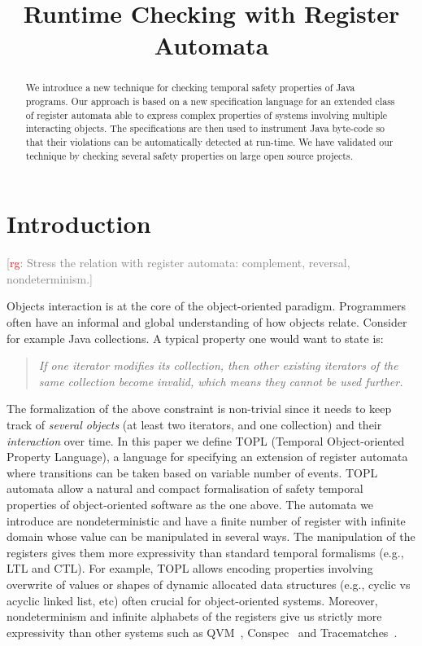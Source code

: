 \documentclass{sigplanconf}[10pt] %
\title{Runtime Checking with Register Automata}
\newcommand{\noterg}[2]{\textcolor{gray}{[\textcolor{red}{#1}: #2]}}
\newcommand{\rg}[1]{\noterg{rg}{#1}}
\begin{document}
\maketitle

\begin{abstract} %
We introduce a new technique for checking temporal safety properties of Java programs.
Our approach is based on a new specification language for an extended class of register automata able to express complex properties of systems involving multiple interacting objects.
The specifications are then used to instrument Java byte-code so that their violations can be automatically detected at run-time.
We have validated our technique by checking several safety properties on large open source projects.
\end{abstract}

\section{Introduction} %

\rg{Stress the relation with register automata: complement, reversal, nondeterminism.}

Objects interaction is at the core of the object-oriented paradigm.
Programmers often have an informal and global understanding of how objects relate.
Consider for example Java collections.
A typical property one would want to state is:
\begin{quote}
{\em If one iterator modifies its collection, then other existing iterators of the same collection become invalid, which means they cannot be used further.}
\end{quote}
\noindent
The formalization of the above constraint is non-trivial since it needs to keep track of {\em several objects} (at least two iterators, and one collection) and their {\em interaction} over time.
In this paper we define TOPL (Temporal Object-oriented Property Language), a language for specifying an extension of register automata~\cite{DBLP:journals/tocl/DemriL09} where transitions can be taken based on variable number of  events.
TOPL automata allow a natural and compact formalisation of safety temporal properties of object-oriented software as the one above.
The automata we introduce are nondeterministic and have a finite number of register with infinite domain whose value can be manipulated in several ways. 
The manipulation of the registers  gives them more expressivity than standard temporal formalisms (e.g., LTL and CTL).
For example, TOPL allows encoding properties involving overwrite of values or shapes of dynamic allocated data structures (e.g., cyclic vs acyclic linked list, etc) often crucial for object-oriented systems.
Moreover, nondeterminism and infinite alphabets of the registers give us strictly more expressivity than other systems such as QVM~\cite{Arnold:2008}, Conspec~\cite{XXX} and Tracematches~\cite{dblp:conf/oopsla/allanachklmsst05}.
\end{document}
